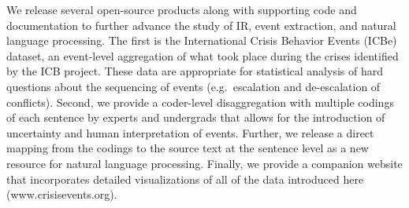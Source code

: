 \documentclass{article}
\begin{document}
We release several open-source products along with supporting code and
documentation to further advance the study of IR, event extraction, and
natural language processing. The first is the International Crisis
Behavior Events (ICBe) dataset, an event-level aggregation of what took
place during the crises identified by the ICB project. These data are
appropriate for statistical analysis of hard questions about the
sequencing of events (e.g.~escalation and de-escalation of conflicts).
Second, we provide a coder-level disaggregation with multiple codings of
each sentence by experts and undergrads that allows for the introduction
of uncertainty and human interpretation of events. Further, we release a
direct mapping from the codings to the source text at the sentence level
as a new resource for natural language processing. Finally, we provide a
companion website that incorporates detailed visualizations of all of
the data introduced here (www.crisisevents.org).
\end{document}
